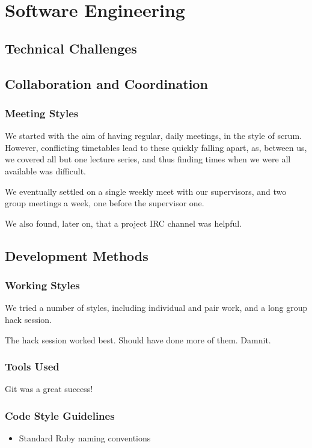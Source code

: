 \chapter{Software Engineering}
\section{Technical Challenges}
\section{Collaboration and Coordination}

  \subsection{Meeting Styles}
    We started with the aim of having regular, daily meetings, in the style of scrum.
    However, conflicting timetables lead to these quickly falling apart, as, between us, we covered all but one lecture series, and thus finding times when we were all available was difficult.

    We eventually settled on a single weekly meet with our supervisors, and two group meetings a week, one before the supervisor one.

    We also found, later on, that a project IRC channel was helpful.


\section{Development Methods}

  \subsection{Working Styles}
    We tried a number of styles, including individual and pair work, and a long group hack session.

    The hack session worked best.
    Should have done more of them.
    Damnit.

  \subsection{Tools Used}
    Git was a great success!

  \subsection{Code Style Guidelines}
    \begin{itemize}
      \item Standard Ruby naming conventions
    \end{itemize}



